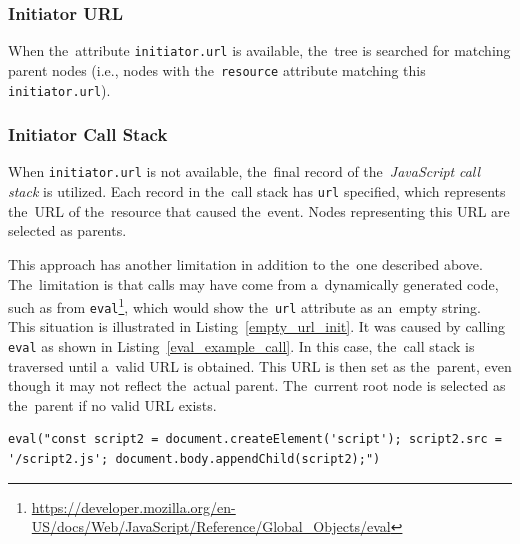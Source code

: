 \subsubsection{Initiator URL}
When the~attribute \texttt{initiator.url} is available, the~tree is searched for matching parent nodes (i.e., nodes with the~\texttt{resource} attribute matching this \texttt{initiator.url}).

\subsubsection{Initiator Call Stack}
When \texttt{initiator.url} is not available, the~final record of the~\textit{JavaScript} \textit{call stack} is utilized. Each record in the~call stack has \texttt{url} specified, which represents the~URL of the~resource that caused the~event. Nodes representing this URL are selected as parents.

This approach has another limitation in addition to the~one described above. The~limitation is that calls may have come from a~dynamically generated code, such as from \texttt{eval}\footnote{\url{https://developer.mozilla.org/en-US/docs/Web/JavaScript/Reference/Global_Objects/eval}}, which would show the~\texttt{url} attribute as an~empty string. This situation is illustrated in Listing~\ref{empty_url_init}. It was caused by calling \texttt{eval} as shown in Listing~\ref{eval_example_call}. In this case, the~call stack is traversed until a~valid URL is obtained. This URL is then set as the~parent, even though it may not reflect the~actual parent. The~current root node is selected as the~parent if no valid URL exists.

\renewcommand{\thelstlisting}{\thechapter.\arabic{lstlisting}}
\renewcommand{\thelisting}{\thechapter.\arabic{listing}} 

\setcounter{listing}{1}

\begin{center}
    \begin{minipage}{\textwidth} %
        \begin{lstlisting}[style=pythonstyle, label={eval_example_call}, caption={Loading a~script using \textit{eval} which resulted in empty \textit{url} parameter in the~call stack.}]
eval("const script2 = document.createElement('script'); script2.src = '/script2.js'; document.body.appendChild(script2);")
        \end{lstlisting}
    \end{minipage}
\end{center}

